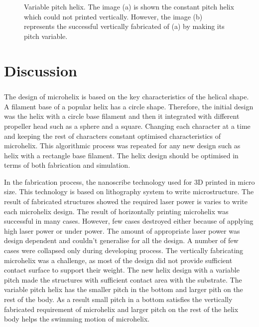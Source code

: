 \documentclass[12pt,a4paper,titlepage]{report}
\begin{document}
\begin{figure}
        \caption[Variable pitch helix]{Variable pitch helix. The image (a) is shown the constant pitch helix which could not printed
vertically. However, the image (b) represents the successful vertically fabricated of (a) by making its pitch
variable.}\label{Pitch variable}

       

\end{figure}



\chapter{Discussion}\label{discussion}

\paragraph{}
The design of microhelix is based on the key characteristics of the helical shape. A filament base of a 
popular helix has a circle shape. Therefore, the initial design was the helix with a circle base filament and then
 it integrated with different propeller head such as a sphere and a square. Changing each character at a time and 
keeping the rest of characters constant optimised characteristics of microhelix. This algorithmic process was repeated
 for any new design such as helix with a rectangle base filament. The helix design should be optimised
 in terms of both fabrication and simulation.


In the fabrication process, the nanoscribe technology used for 3D printed in micro size. This
 technology is based on lithography system to write microstructure. The result of fabricated structures
 showed the required laser power is varies to write each microhelix design. The result of horizontally printing 
microhelix was successful in many cases. However, few cases destroyed either because of applying high laser 
power or under power. The amount of appropriate laser power was design dependent and couldn\rq{}t generalise for 
all the design. A number of few cases were collapsed only during developing process. The vertically fabricating 
microhelix was a challenge, as most of the design did not provide sufficient contact surface to support their 
weight. The new helix design with a variable pitch made the structures with sufficient contact area with the
 substrate. The variable pitch helix has the smaller pitch in the bottom and larger pith on the rest of the 
body. As a result small pitch in a bottom satisfies the vertically fabricated requirement of microhelix 
and larger pitch on the rest of the helix body helps the swimming motion of microhelix. 
\end{document}

